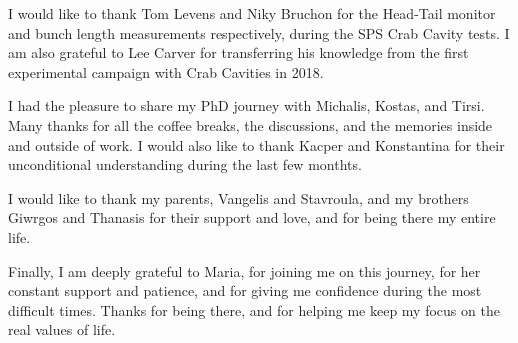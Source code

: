I would like to thank Tom Levens and Niky Bruchon for the Head-Tail monitor and bunch length measurements respectively, during the SPS Crab Cavity tests. I am also grateful to Lee Carver for transferring his knowledge from the first experimental campaign with Crab Cavities in 2018.

I had the pleasure to share my PhD journey with Michalis, Kostas, and Tirsi. Many thanks for all the coffee breaks, the discussions, and the memories inside and outside of work. I would also like to thank Kacper and Konstantina for their unconditional understanding during the last few monthts. 

I would like to thank my parents, Vangelis and Stavroula, and my brothers Giwrgos and Thanasis for their support and love, and for being there my entire life. 


Finally, I am deeply grateful to Maria, for joining me on this journey, for her constant support and patience, and for giving me confidence during the most difficult times. Thanks for being there, and for helping me keep my focus on the real values of life.